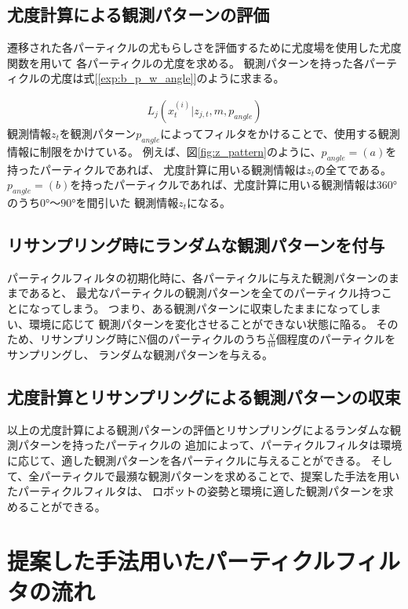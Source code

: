 \subsection{尤度計算による観測パターンの評価}

遷移された各パーティクルの尤もらしさを評価するために尤度場を使用した尤度関数を用いて
各パーティクルの尤度を求める。
観測パターンを持った各パーティクルの尤度は式[\ref{exp:b_p_w_angle}]のように求まる。

\begin{eqnarray}
  \label{exp:b_p_w_angle}
  L_j(x_{t}^{(i)} | z_{j, t}, m, p_{angle})
\end{eqnarray}
観測情報$z_t$を観測パターン$p_{angle}$によってフィルタをかけることで、使用する観測情報に制限をかけている。
例えば、図\ref{fig:z_pattern}のように、$p_{angle} = (a)$を持ったパーティクルであれば、
尤度計算に用いる観測情報は$z_t$の全てである。
$p_{angle} = (b)$を持ったパーティクルであれば、尤度計算に用いる観測情報は$360°$のうち$0°〜90°$を間引いた
観測情報$z_t$になる。


\subsection{リサンプリング時にランダムな観測パターンを付与}

パーティクルフィルタの初期化時に、各パーティクルに与えた観測パターンのままであると、
最尤なパーティクルの観測パターンを全てのパーティクル持つことになってしまう。
つまり、ある観測パターンに収束したままになってしまい、環境に応じて
観測パターンを変化させることができない状態に陥る。
そのため、リサンプリング時にN個のパーティクルのうち$\frac{N}{10}$個程度のパーティクルをサンプリングし、
ランダムな観測パターンを与える。

\subsection{尤度計算とリサンプリングによる観測パターンの収束}

以上の尤度計算による観測パターンの評価とリサンプリングによるランダムな観測パターンを持ったパーティクルの
追加によって、パーティクルフィルタは環境に応じて、適した観測パターンを各パーティクルに与えることができる。
そして、全パーティクルで最瀕な観測パターンを求めることで、提案した手法を用いたパーティクルフィルタは、
ロボットの姿勢と環境に適した観測パターンを求めることができる。

\newpage
\section{提案した手法用いたパーティクルフィルタの流れ}

